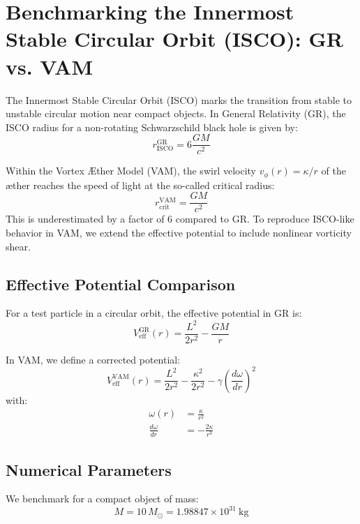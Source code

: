 \section{Benchmarking the Innermost Stable Circular Orbit (ISCO): GR vs. VAM}

The Innermost Stable Circular Orbit (ISCO) marks the transition from stable to unstable circular motion near compact objects. In General Relativity (GR), the ISCO radius for a non-rotating Schwarzschild black hole is given by:
\begin{equation}
    r_{\text{ISCO}}^{\text{GR}} = 6\frac{GM}{c^2}
\end{equation}

Within the Vortex Æther Model (VAM), the swirl velocity \( v_\phi(r) = \kappa/r \) of the æther reaches the speed of light at the so-called critical radius:
\begin{equation}
    r_{\text{crit}}^{\text{VAM}} = \frac{GM}{c^2}
\end{equation}
This is underestimated by a factor of 6 compared to GR. To reproduce ISCO-like behavior in VAM, we extend the effective potential to include nonlinear vorticity shear.

\subsection{Effective Potential Comparison}

For a test particle in a circular orbit, the effective potential in GR is:
\begin{equation}
    V_{\text{eff}}^{\text{GR}}(r) = \frac{L^2}{2r^2} - \frac{GM}{r}
\end{equation}

In VAM, we define a corrected potential:
\begin{equation}
    V_{\text{eff}}^{\text{VAM}}(r) = \frac{L^2}{2r^2} - \frac{\kappa^2}{2r^2} - \gamma \left(\frac{d\omega}{dr}\right)^2
\end{equation}
with:
\begin{align}
    \omega(r) &= \frac{\kappa}{r^2} \\
    \frac{d\omega}{dr} &= -\frac{2\kappa}{r^3}
\end{align}

\subsection{Numerical Parameters}

We benchmark for a compact object of mass:
\begin{equation}
    M = 10\,M_\odot = 1.98847 \times 10^{31}~\text{kg}
\end{equation}

